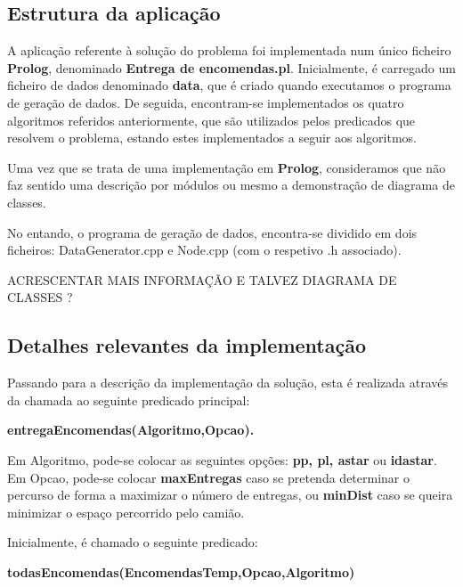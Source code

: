 \documentclass[a4paper]{article}
\begin{document}
\subsection{Estrutura da aplicação} 

A aplicação referente à solução do problema foi implementada num único ficheiro \textbf{Prolog}, denominado \textbf{Entrega de encomendas.pl}. Inicialmente, é carregado um ficheiro de dados denominado \textbf{data}, que é criado quando executamos o programa de geração de dados. De seguida, encontram-se implementados os quatro algoritmos referidos anteriormente, que são utilizados pelos predicados que resolvem o problema, estando estes implementados a seguir aos algoritmos.

Uma vez que se trata de uma implementação em \textbf{Prolog}, consideramos que não faz sentido uma descrição por módulos ou mesmo a demonstração de diagrama de classes.

No entando, o programa de geração de dados, encontra-se dividido em dois ficheiros: DataGenerator.cpp e Node.cpp (com o respetivo .h associado).

ACRESCENTAR MAIS INFORMAÇÃO E TALVEZ DIAGRAMA DE CLASSES ?

\subsection{Detalhes relevantes da implementação} 

Passando para a descrição da implementação da solução, esta é realizada através da chamada ao seguinte predicado principal:

\centerline{\textbf{entregaEncomendas(Algoritmo,Opcao).}}

Em Algoritmo, pode-se colocar as seguintes opções: \textbf{pp, pl, astar} ou \textbf{idastar}. Em Opcao, pode-se colocar \textbf{maxEntregas} caso se pretenda determinar o percurso de forma a maximizar o número de entregas, ou \textbf{minDist} caso se queira minimizar o espaço percorrido pelo camião.

Inicialmente, é chamado o seguinte predicado:

\centerline{\textbf{todasEncomendas(EncomendasTemp,Opcao,Algoritmo)}}
\end{document}
